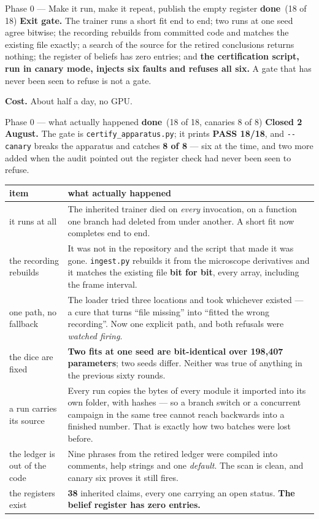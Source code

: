\documentclass[11pt,a4paper]{article}
\newcommand{\code}[1]{\texttt{#1}}
\newcommand{\dn}{\textcolor{good}{\textbf{done}}}
\begin{document}
\begin{phasebox}{Phase 0 --- Make it run, make it repeat, publish the empty register \hfill \dn\ (18 of 18)}
\textbf{Exit gate.} The trainer runs a short fit end to end; two runs at one seed agree bitwise;
the recording rebuilds from committed code and matches the existing file exactly; a search of the
source for the retired conclusions returns nothing; the register of beliefs has zero entries; and
\textbf{the certification script, run in canary mode, injects six faults and refuses all six.}
A gate that has never been seen to refuse is not a gate.

\textbf{Cost.} About half a day, no GPU.
\end{phasebox}

\begin{phasebox}{Phase 0 --- what actually happened \hfill \dn\ (18 of 18, canaries 8 of 8)}
\textbf{Closed 2 August.} The gate is \code{certify\_apparatus.py}; it prints \textbf{PASS 18/18},
and \code{-{}-canary} breaks the apparatus and catches \textbf{8 of 8} --- six at the time, and two more added when the audit pointed out the register check had never been seen to refuse.

\footnotesize
\begin{tabular}{@{}l p{10.6cm}@{}}
\toprule
\textbf{item} & \textbf{what actually happened}\\
\midrule
it runs at all & The inherited trainer died on \emph{every} invocation, on a function one branch
had deleted from under another. A short fit now completes end to end.\\
the recording rebuilds & It was not in the repository and the script that made it was gone.
\code{ingest.py} rebuilds it from the microscope derivatives and it matches the existing file
\textbf{bit for bit}, every array, including the frame interval.\\
one path, no fallback & The loader tried three locations and took whichever existed --- a cure
that turns ``file missing'' into ``fitted the wrong recording''. Now one explicit path, and both
refusals were \emph{watched firing}.\\
the dice are fixed & \textbf{Two fits at one seed are bit-identical over 198{,}407 parameters};
two seeds differ. Neither was true of anything in the previous sixty rounds.\\
a run carries its source & Every run copies the bytes of every module it imported into its own
folder, with hashes --- so a branch switch or a concurrent campaign in the same tree cannot reach
backwards into a finished number. That is exactly how two batches were lost before.\\
the ledger is out of the code & Nine phrases from the retired ledger were compiled into comments,
help strings and one \emph{default}. The scan is clean, and canary six proves it still fires.\\
the registers exist & \textbf{38} inherited claims, every one carrying an open status.
\textbf{The belief register has zero entries.}\\
\bottomrule
\end{tabular}
\normalsize


\end{phasebox}
\end{document}

